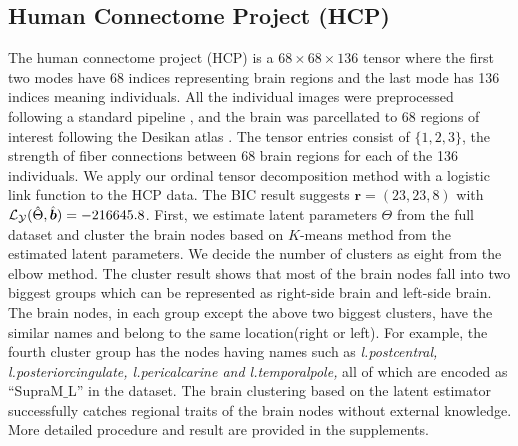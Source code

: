 \documentclass{article}
\theoremstyle{plain}
\theoremstyle{definition}
\begin{document}
\subsection{Human Connectome Project (HCP)}
The human connectome project (HCP) is a $68\times 68 \times 136$ tensor where the first two modes have 68 indices representing brain regions and the last mode has 136 indices meaning individuals. All the individual images were preprocessed following a standard pipeline \citep{zhang2018mapping}, and the brain was parcellated to 68 regions of interest following the Desikan atlas \citep{desikan2006automated}. The tensor entries consist of $\{1,2,3\}$, the strength of fiber connections between 68 brain regions for each of the 136 individuals. We apply our ordinal tensor decomposition method with a logistic link function to the HCP data. The BIC result suggests $\bm r = (23,23,8)$  with $\mathcal{L}_\mathcal{Y}(\hat{\Theta},\hat{\bm{b}}) = -216645.8$.
First, we estimate latent parameters $\Theta$ from the full dataset and cluster the brain nodes based on $K$-means method from the estimated latent parameters. We decide the number of clusters as eight from the elbow method. The cluster result shows that most of the brain nodes fall into two biggest groups which can be represented as right-side brain and left-side brain.
The brain nodes, in each group except the above two biggest clusters, have the similar names and belong to the same location(right or left). For example, the fourth cluster group has the nodes having names such as \textit{l.postcentral, l.posteriorcingulate, l.pericalcarine and l.temporalpole,} all of which are encoded as ``SupraM$\_$L'' in the dataset. The brain clustering based on the latent estimator successfully catches regional traits of the brain nodes without external knowledge. More detailed procedure and result are provided in the supplements.
\end{document}
